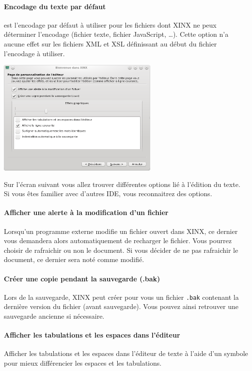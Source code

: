 \documentclass[a4paper,10pt,twoside]{book}
\begin{document}
\paragraph{Encodage du texte par défaut} est l'encodage par défaut à utiliser pour les fichiers dont XINX ne peux déterminer l'encodage (fichier texte, fichier JavaScript, \dots). Cette option n'a aucune effet sur les fichiers XML et XSL définissant au début du fichier l'encodage à utiliser.

\begin{center}
 \includegraphics[width=0.60\textwidth]{./firstinstall3.png}
\end{center}

Sur l'écran suivant vous allez trouver différentes options lié à l'édition du texte. Si vous êtes familier avec d'autres IDE, vous reconnaitrez des options. 

\paragraph{Afficher une alerte à la modification d'un fichier} Lorsqu'un programme externe modifie un fichier ouvert dans XINX, ce dernier vous demandera alors automatiquement de recharger le fichier. Vous pourrez choisir de rafraichir ou non le document. Si vous décider de ne pas rafraichir le document, ce dernier sera noté comme modifié.

\paragraph{Créer une copie pendant la sauvegarde (.bak)} Lors de la sauvegarde, XINX peut créer pour vous un fichier \verb+.bak+ contenant la dernière version du fichier (avant sauvegarde). Vous pouvez ainsi retrouver une sauvegarde ancienne si nécessaire. 

\paragraph{Afficher les tabulations et les espaces dans l'éditeur} Afficher les tabulations et les espaces dans l'éditeur de texte à l'aide d'un symbole pour mieux différencier les espaces et les tabulations.
\end{document}
